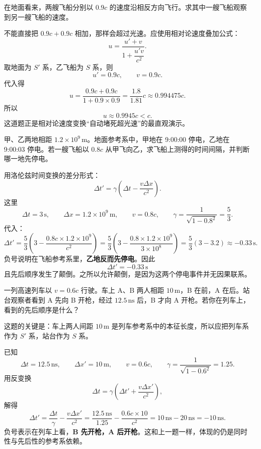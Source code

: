 \documentclass[lang=cn,11pt]{elegantbook}
\begin{document}
\begin{example}[相向 \(0.9c\) 飞船的相对速度]
在地面看来，两艘飞船分别以 \(0.9c\) 的速度沿相反方向飞行。求其中一艘飞船观察到另一艘飞船的速度。
\end{example}

\begin{solution}
不能直接把 \(0.9c+0.9c\) 相加，那样会超过光速。应使用相对论速度叠加公式：
\[
u=\frac{u'+v}{1+\dfrac{u'v}{c^2}}.
\]
取地面为 \(S'\) 系，乙飞船为 \(S\) 系，则
\[
u' = 0.9c,\qquad v=0.9c.
\]
代入得
\[
u=\frac{0.9c+0.9c}{1+0.9\times 0.9}
=\frac{1.8}{1.81}c
\approx 0.994475c.
\]
所以
\[
\boxed{u\approx 0.9945c<c.}
\]
这道题正是相对论速度变换“自动堵死超光速”的最直观演示。
\end{solution}

\begin{example}[停电事件的先后顺序在飞船上怎样变化]
甲、乙两地相距 \(1.2\times 10^9\,\mathrm{m}\)。地面参考系中，甲地在 9:00:00 停电，乙地在 9:00:03 停电。若一艘飞船以 \(0.8c\) 从甲飞向乙，求飞船上测得的时间间隔，并判断哪一地先停电。
\end{example}

\begin{solution}
用洛伦兹时间变换的差分形式：
\[
\Delta t'=\gamma\left(\Delta t-\frac{v\Delta x}{c^2}\right).
\]
这里
\[
\Delta t=3\,\mathrm{s},
\qquad
\Delta x=1.2\times 10^9\,\mathrm{m},
\qquad
v=0.8c,
\qquad
\gamma=\frac{1}{\sqrt{1-0.8^2}}=\frac53.
\]
代入：
\[
\Delta t'
=\frac53\left(3-\frac{0.8c\times 1.2\times 10^9}{c^2}\right)
=\frac53\left(3-\frac{0.8\times 1.2\times 10^9}{3\times 10^8}\right)
=\frac53(3-3.2)
\approx -0.33\,\mathrm{s}.
\]
负号说明在飞船参考系里，\textbf{乙地反而先停电}。因此
\[
\boxed{\Delta t'=-0.33\,\mathrm{s}}
\]
且先后顺序发生了颠倒。之所以允许颠倒，是因为这两个停电事件并无因果联系。
\end{solution}

\begin{example}[列车枪战中的先后顺序]
一列高速列车以 \(v=0.6c\) 行驶。车上 A、B 两人相距 \(10\,\mathrm{m}\)，B 在前，A 在后。站台观察者看到 A 先向 B 开枪，经过 \(12.5\,\mathrm{ns}\) 后，B 才向 A 开枪。若你在列车上，看到的先后顺序是什么？
\end{example}

\begin{solution}
这题的关键是：车上两人间距 \(10\,\mathrm{m}\) 是列车参考系中的本征长度，所以应把列车系作为 \(S'\) 系，站台作为 \(S\) 系。

已知
\[
\Delta t=12.5\,\mathrm{ns},
\qquad
\Delta x'=10\,\mathrm{m},
\qquad
v=0.6c,
\qquad
\gamma=\frac{1}{\sqrt{1-0.6^2}}=1.25.
\]
用反变换
\[
\Delta t=\gamma\left(\Delta t'+\frac{v\Delta x'}{c^2}\right),
\]
解得
\[
\Delta t'=\frac{\Delta t}{\gamma}-\frac{v\Delta x'}{c^2}
=\frac{12.5\,\mathrm{ns}}{1.25}-\frac{0.6c\times 10}{c^2}
=10\,\mathrm{ns}-20\,\mathrm{ns}
=-10\,\mathrm{ns}.
\]
负号表示在列车上看，\textbf{B 先开枪，A 后开枪}。这和上一题一样，体现的仍是同时性与先后性的参考系依赖。
\end{solution}
\end{document}
